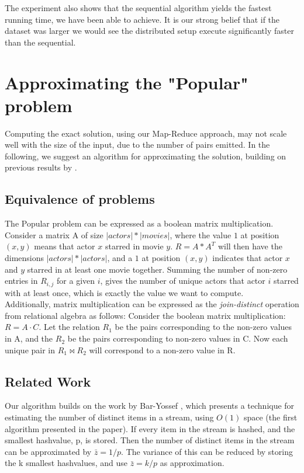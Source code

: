 \documentclass[a4paper,11pt]{article}
\begin{document}
The experiment also shows that the sequential algorithm yields the fastest running time, we have been able to achieve. 
It is our strong belief that if the dataset was larger we would see the distributed setup execute significantly faster than the sequential.

\section{Approximating the "Popular" problem}
Computing the exact solution, using our Map-Reduce approach, may not scale well with the size of the input, due to the number of pairs emitted. In the following, we suggest an algorithm for approximating the solution, building on previous results by \cite{paper:amossen}.

\subsection{Equivalence of problems}
The Popular problem can be expressed as a boolean matrix multiplication. Consider a matrix A of size $|actors|*|movies|$, where the value $1$ at position $(x, y)$ means that actor $x$ starred in movie $y$. $R = A * A^T$ will then have the dimensions $|actors|*|actors|$, and a $1$ at position $(x, y)$ indicates that actor $x$ and $y$ starred in at least one movie together. Summing the number of non-zero entries in $R_{i,j}$ for a given $i$, gives the number of unique actors that actor $i$ starred with at least once, which is exactly the value we want to compute.\\
Additionally, matrix multiplication can be expressed as the \emph{join-distinct} operation from relational algebra as follows: Consider the boolean matrix multiplication: $R = A \cdot C$. Let the relation $R_1$ be the pairs corresponding to the non-zero values in A, and the $R_2$ be the pairs corresponding to non-zero values in C. Now each unique pair in $R_1 \Join R_2$ will correspond to a non-zero value in R.

\subsection{Related Work}
Our algorithm builds on the work by Bar-Yossef \cite{paper:bar-yos}, which presents a technique for estimating the number of distinct items in a stream, using $O(1)$ space (the first algorithm presented in the paper). If every item in the stream is hashed, and the smallest hashvalue, p, is stored. Then the number of distinct items in the stream can be approximated by $\bar{z}=1/p$. The variance of this can be reduced by storing the k smallest hashvalues, and use $\bar{z}=k/p$ as approximation.\\
\end{document}
